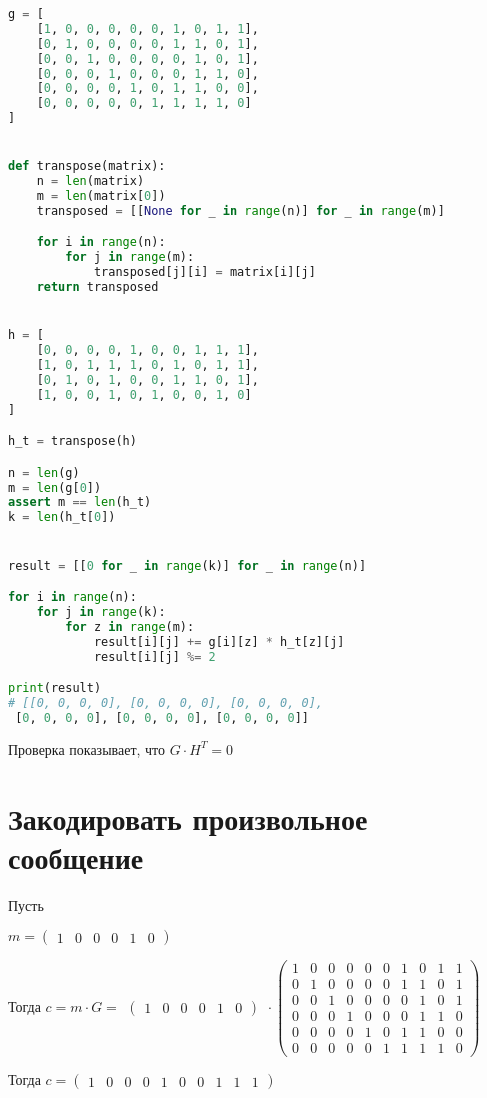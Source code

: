 \documentclass{article}
\begin{document}
	\begin{lstlisting}[language=python]
g = [
	[1, 0, 0, 0, 0, 0, 1, 0, 1, 1],
	[0, 1, 0, 0, 0, 0, 1, 1, 0, 1],
	[0, 0, 1, 0, 0, 0, 0, 1, 0, 1],
	[0, 0, 0, 1, 0, 0, 0, 1, 1, 0],
	[0, 0, 0, 0, 1, 0, 1, 1, 0, 0],
	[0, 0, 0, 0, 0, 1, 1, 1, 1, 0]
]


def transpose(matrix):
	n = len(matrix)
	m = len(matrix[0])
	transposed = [[None for _ in range(n)] for _ in range(m)]

	for i in range(n):
		for j in range(m):
			transposed[j][i] = matrix[i][j]
	return transposed


h = [
	[0, 0, 0, 0, 1, 0, 0, 1, 1, 1],
	[1, 0, 1, 1, 1, 0, 1, 0, 1, 1],
	[0, 1, 0, 1, 0, 0, 1, 1, 0, 1],
	[1, 0, 0, 1, 0, 1, 0, 0, 1, 0]
]

h_t = transpose(h)

n = len(g)
m = len(g[0])
assert m == len(h_t)
k = len(h_t[0])


result = [[0 for _ in range(k)] for _ in range(n)]

for i in range(n):
	for j in range(k):
		for z in range(m):
			result[i][j] += g[i][z] * h_t[z][j]
			result[i][j] %= 2

print(result)
# [[0, 0, 0, 0], [0, 0, 0, 0], [0, 0, 0, 0],
 [0, 0, 0, 0], [0, 0, 0, 0], [0, 0, 0, 0]]
	\end{lstlisting}
	
	Проверка показывает, что $G \cdot H^T = 0$
	
	\section{Закодировать произвольное сообщение}
	
	Пусть 
	
	$
	m = \left(
	\begin{array}{cccccc}
	1 & 0 & 0 & 0 & 1 & 0
	\end{array}
	\right)
	$
	
	Тогда $c = m \cdot G = \begin{array}{cccccc}
	\left(
	\begin{array}{cccccc}
	1 & 0 & 0 & 0 & 1 & 0
	\end{array}
	\right)
	\end{array} \cdot  \left(
	\begin{array}{cccccccccc}
	1& 0& 0& 0& 0& 0   & 1& 0& 1& 1  \\
	0& 1& 0& 0& 0& 0   & 1& 1& 0& 1  \\
	0 &0 &1 &0 &0 &0   & 0 &1 &0 &1 \\ 
	0 &0 &0 &1 &0 &0   & 0 &1 &1 &0 \\
	0 &0 &0 &0 &1 &0   & 1 &1 &0 &0  \\
	0 &0 &0 &0 &0 &1  & 1 &1 &1 &0 
	\end{array}
	\right)$
	
	Тогда $
	c = \left(
	\begin{array}{cccccccccc}
	1 & 0 &0 &0 &1 &0 &0 &1 &1 &1
	\end{array}
	\right)
	$
\end{document}
